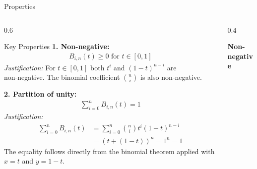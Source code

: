 \begin{frame}{Properties}
  \begin{columns}
    \begin{column}{0.6\textwidth}
      \begin{conceptbox}{Key Properties}
        \footnotesize
        \textbf{1. Non-negative:}
        \begin{align*}
          B_{i,n}(t)  \geq 0 \text{ for } t\in[0,1]
        \end{align*}
        {
          \scriptsize
          \emph{Justification:} For \(t\in[0,1]\) both \(t^i\) and \((1-t)^{n-i}\) are non‑negative. The binomial coefficient \(\binom{n}{i}\) is also non‑negative.
        }

        \vspace{0.6em}
        \textbf{2. Partition of unity:}
        \begin{align*}
          \sum_{i=0}^n B_{i,n}(t) = 1
        \end{align*}
        {
          \scriptsize
          \emph{Justification:}
          \begin{align*}
            \sum_{i=0}^n B_{i,n}(t) &=  \sum_{i=0}^n \binom{n}{i} t^i (1-t)^{n-i} \\
            &= (t + (1-t))^n = 1^n = 1
          \end{align*}
          The equality follows directly from the binomial theorem applied with \(x=t\) and \(y=1-t\).
        }
      \end{conceptbox}
    \end{column}

    \begin{column}{0.4\textwidth}
      \begin{center}
        \textbf{Non-negative}

      \end{center}


\end{column}
\end{columns}
\end{frame}
